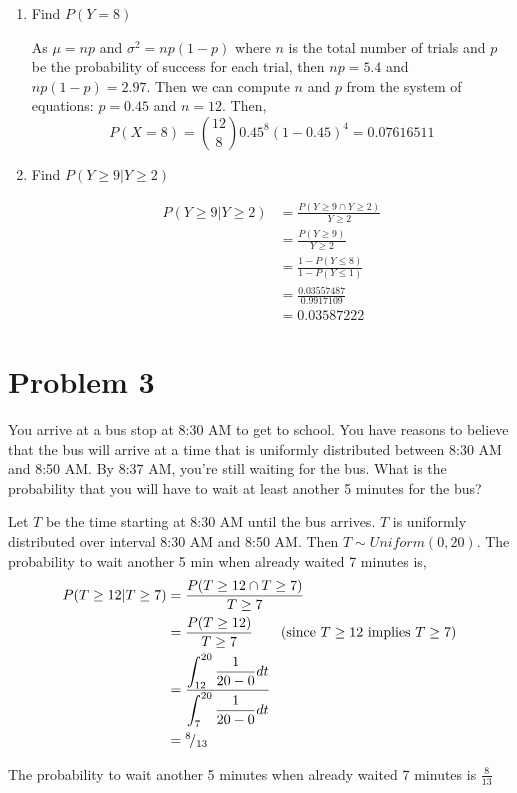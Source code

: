 \documentclass[11pt]{article}
\begin{document}
\begin{enumerate}
  \item Find $P(Y = 8)$
  \begin{solution}
    $ $\\
    As $\mu = np$ and $\sigma^2 = np(1-p)$ where $n$ is the total number of trials and $p$ be the probability of success for each trial, then $np = 5.4$ and $np(1-p) = 2.97$. Then we can compute $n$ and $p$ from the system of equations: $p = 0.45$ and $n = 12$. Then,
    \[
      P(X = 8) = \binom{12}{8}0.45^8(1-0.45)^4 = 0.07616511
    \]
  \end{solution}

  \item Find $P(Y \geq 9|Y \geq 2)$
  \begin{solution}
    $ $\\
    \begin{align*}
      P(Y \geq 9|Y \geq 2) &= \frac{P(Y \geq 9\cap Y \geq 2)}{Y \geq 2}\\
      &= \frac{ P(Y \geq 9)}{Y \geq 2} \tag{$Y \geq 9$ implies $Y \geq 2$}\\
      &= \frac{1-P(Y\leq 8)}{1-P(Y\leq 1)} \\
      &= \frac{0.03557487}{0.9917109} \tag{compute $pbinom(k,12,0.45)$, using R}\\
      &=0.03587222
    \end{align*}
  \end{solution}
\end{enumerate}


\pagebreak

\section*{Problem 3}
You arrive at a bus stop at 8:30 AM to get to school. You have reasons to believe that the bus will arrive at a time that is uniformly distributed between 8:30 AM and 8:50 AM. By 8:37 AM, you’re still waiting for the bus. What is the probability that you will have to wait at least another 5 minutes for the bus?

\begin{solution}
  $ $\\
  Let $T$ be the time starting at 8:30 AM until the bus arrives. $T$ is uniformly distributed over interval 8:30 AM and 8:50 AM. Then $T\sim Uniform(0, 20)$. The probability to wait another 5 min when already waited 7 minutes is,
  \begin{align*}
    P(T\geq 12 | T\geq 7) &= \frac{P(T\geq 12 \cap T\geq 7)}{T\geq 7}\\
    &= \frac{P(T\geq 12)}{T\geq 7} \tag{since $T\geq 12$ implies $T\geq 7$}\\
    &= \frac{\displaystyle\int_{12}^{20} \frac{1}{20-0}dt }{\displaystyle\int_{7}^{20} \frac{1}{20-0}dt}\\
    &={}^{8}\!/_{13}
  \end{align*}

  The probability to wait another 5 minutes when already waited 7 minutes is $\frac{8}{13}$
\end{solution}
\end{document}
